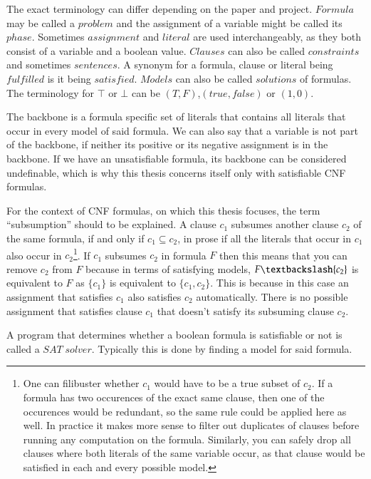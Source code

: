 

The exact terminology can differ depending on the paper and project. $Formula$ may be called a $problem$ and the assignment of a variable might be called its $phase$. Sometimes $assignment$ and $literal$ are used interchangeably, as they both consist of a variable and a boolean value. $Clauses$ can also be called $constraints$ and sometimes $sentences$. A synonym for a formula, clause or literal being $fulfilled$ is it being $satisfied$. $Models$ can also be called $solutions$ of formulas. The terminology for $\top$ or $\bot$ can be $(T,F)$,$(true,false)$ or $(1,0)$.

The backbone is a formula specific set of literals that contains all literals that occur in every model of said formula. We can also say that a variable is not part of the backbone, if neither its positive or its negative assignment is in the backbone. If we have an unsatisfiable formula, its backbone can be considered undefinable, which is why this thesis concerns itself only with satisfiable CNF formulas.

For the context of CNF formulas, on which this thesis focuses, the term ``subsumption'' should to be explained. A clause $c_1$ subsumes another clause $c_2$ of the same formula, if and only if $c_1 \subseteq c_2$, in prose if all the literals that occur in $c_1$ also occur in $c_2$\footnote{
	One can filibuster whether $c_1$ would have to be a true subset of $c_2$. If a formula has two occurences of the exact same clause, then one of the occurences would be redundant, so the same rule could be applied here as well. In practice it makes more sense to filter out duplicates of clauses before running any computation on the formula. Similarly, you can safely drop all clauses where both literals of the same variable occur, as that clause would be satisfied in each and every possible model.}.
If $c_1$ subsumes $c_2$ in formula $F$ then this means that you can remove $c_2$ from $F$ because in terms of satisfying models, $F\textbackslash \{c_2\}$ is equivalent to $F$ as $\{c_1\}$ is equivalent to $\{c_1,c_2\}$. This is because in this case an assignment that satisfies $c_1$ also satisfies $c_2$ automatically. There is no possible assignment that satisfies clause $c_1$ that doesn't satisfy its subsuming clause $c_2$.

A program that determines whether a boolean formula is satisfiable or not is called a $SAT\; solver$. Typically this is done by finding a model for said formula.